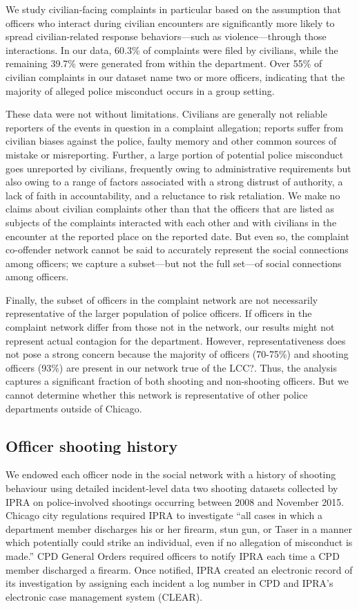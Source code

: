 We study civilian-facing complaints in particular based on the assumption that 
officers who interact during civilian encounters are
significantly more likely to spread civilian-related response behaviors---such as violence---through
those interactions. In our data, 60.3\% of complaints were filed by civilians,
while the remaining 39.7\% were generated from within the department. 
Over 55\% of civilian complaints in our dataset name two or more officers,
indicating that the majority of alleged police misconduct occurs in a group
setting.

These data were not without limitations.
Civilians are generally not reliable reporters of the events in question in a complaint allegation;
reports suffer from civilian biases against the police, faulty memory and other
common sources of mistake or misreporting. 
Further, a large portion of potential police misconduct goes unreported by
civilians, frequently owing to administrative requirements but also owing to a
range of factors associated with a strong distrust of authority, a lack of
faith in accountability, and a reluctance to risk retaliation.  
We make no claims about civilian
complaints other than that the officers that are listed as subjects of the
complaints interacted with each other and with civilians in the encounter at
the reported place on the reported date. 
But even so, the complaint
co-offender network cannot be said to accurately represent the social
connections among officers; we capture a subset---but not the full set---of 
social connections among officers.

Finally, the subset of officers in the complaint network are not necessarily
representative of the larger population of police officers. If officers in the
complaint network differ from those not in the network, our results might not
represent actual contagion for the department. However, representativeness does 
not pose a strong concern because the majority of officers (70-75\%) and shooting officers (93\%)  are present in our 
network {\color{red} true of the LCC?}. Thus, the analysis captures a significant
fraction of both shooting and non-shooting officers. 
 But we cannot determine whether this network
is representative of other police departments outside of Chicago. 

\subsection{Officer shooting history}

We endowed each officer node in the social network with a history of shooting behaviour
using detailed incident-level data {\color{red} two shooting datasets}
collected by IPRA on police-involved shootings occurring between 2008 and
November 2015. Chicago city regulations required IPRA to investigate ``all cases
in which a department member discharges his or her firearm, stun gun, or Taser
in a manner which potentially could strike an individual, even if no allegation
of misconduct is made.'' CPD General Orders required officers to notify IPRA
each time a CPD member discharged a firearm. Once notified, IPRA created an
electronic record of its investigation by assigning each incident a log number
in CPD and IPRA’s electronic case management system (CLEAR). 

